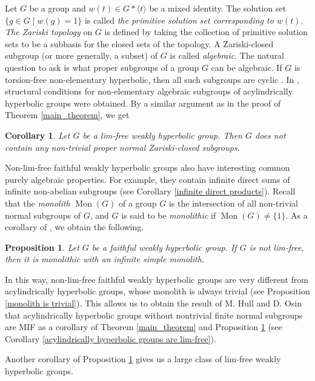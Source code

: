 \documentclass[11pt,letterpaper]{article}
\DeclareMathOperator{\Mon}{Mon}
\newtheorem{corA}[thmA]{Corollary}
\newtheorem{propA}[thmA]{Proposition}
\theoremstyle{definition}
\theoremstyle{remark}
\begin{document}
Let $G$ be a group and $w(t) \in G*\langle t\rangle$ be a mixed identity. The solution set $\{g \in G \mid w(g)=1\}$ is called { \it the primitive solution set corresponding to $w(t)$}. {\it The Zariski topology} on $G$ is defined by taking the collection of primitive solution sets to be a subbasis for the closed sets of the topology. A Zariski-closed subgroup (or more generally, a subset) of $G$ is called {\it algebraic}. The natural question to ask is what proper subgroups of a group $G$ can be algebraic. If $G$ is torsion-free non-elementary hyperbolic, then all such subgroups are cyclic \cite{KM}. In \cite{Jac}, structural conditions for non-elementary algebraic subgroups of acylindrically hyperbolic groups were obtained. By a similar argument as in the proof of Theorem \ref{main_theorem}, we get

\begin{corA}\label{algebraic subgroups}
Let $G$ be a lim-free weakly hyperbolic group. Then $G$ does not contain any non-trivial proper normal Zariski-closed subgroups.
\end{corA}

Non-lim-free faithful weakly hyperbolic groups also have interesting common purely algebraic properties. For example, they contain infinite direct sums of infinite non-abelian subgroups (see Corollary \ref{infinite direct products}). Recall that the {\it monolith} $\Mon(G)$ of a group $G$ is the intersection of all non-trivial normal subgroups of $G$, and $G$ is said to be {\it monolithic} if $\Mon(G) \neq \{1\}$. As a corollary of \cite[Corollary 1.7]{GR}, we obtain the following. 

\begin{propA}\label{monolithic groups}
Let $G$ be a faithful weakly hyperbolic group. If $G$ is not lim-free, then it is monolithic with an infinite simple monolith.
\end{propA} 
In this way, non-lim-free faithful weakly hyperbolic groups are very different from acylindrically hyperbolic groups, whose monolith is always trivial (see Proposition \ref{monolith is trivial}). This allows us to obtain the result of M. Hull and D. Osin \cite[Corollary 5.10]{OH} that acylindrically hyperbolic groups without nontrivial finite normal subgroups are MIF as a corollary of Theorem \ref{main_theorem} and Proposition \ref{monolithic groups} (see Corollary \ref{acylindrically hyperbolic groups are lim-free}). 

Another corollary of Proposition \ref{monolithic groups} gives us a large class of lim-free weakly hyperbolic groups.
\end{document}
